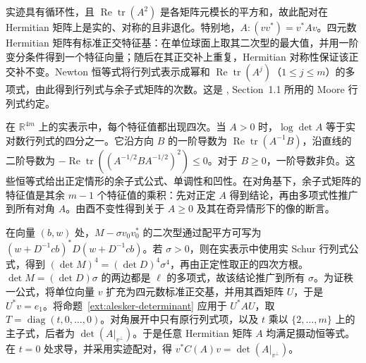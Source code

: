 实迹具有循环性，且 $\operatorname{Re}\operatorname{tr}(A^2)$ 是各矩阵元模长的平方和，故此配对在 Hermitian 矩阵上是实的、对称的且非退化。特别地，$A:(vv^*)=v^*Av$。四元数 Hermitian 矩阵有标准正交特征基：在单位球面上取其二次型的最大值，并用一阶变分条件得到一个特征向量；随后在其正交补上重复，Hermitian 对称性保证该正交补不变。Newton 恒等式将行列式表示成幂和 $\operatorname{Re}\operatorname{tr}(A^j)$（$1\le j\le m$）的多项式，由此得到行列式与余子式矩阵的次数。这是 \cite{r-2}, Section~1.1 所用的 Moore 行列式约定。

在 $\mathbb R^{4m}$ 上的实表示中，每个特征值都出现四次。当 $A>0$ 时，$\log\det A$ 等于实对数行列式的四分之一。它沿方向 $B$ 的一阶导数为 $\operatorname{Re}\operatorname{tr}(A^{-1}B)$，沿直线的二阶导数为 $-\operatorname{Re}\operatorname{tr}((A^{-1/2}BA^{-1/2})^2)\le0$。对于 $B\ge0$，一阶导数非负。这些恒等式给出正定情形的余子式公式、单调性和凹性。在对角基下，余子式矩阵的特征值是其余 $m-1$ 个特征值的乘积：先对正定 $A$ 得到结论，再由多项式性推广到所有对角 $A$。由酉不变性得到关于 $A\ge0$ 及其在奇异情形下的像的断言。

在向量 $(b,w)$ 处，$M-\sigma v_0v_0^*$ 的二次型通过配平方可写为 $(w+D^{-1}cb)^*D(w+D^{-1}cb)$。若 $\sigma>0$，则在实表示中使用实 Schur 行列式公式，得到 $(\det M)^4=(\det D)^4\sigma^4$，再由正定性取正的四次方根。$\det M=(\det D)\sigma$ 的两边都是 $\ell$ 的多项式，故该结论推广到所有 $\sigma$。为证秩一公式，将单位向量 $v$ 扩充为四元数标准正交基，并用其酉矩阵 $U$，于是 $U^*v=e_1$。将命题~\ref{ext:alesker-determinant} 应用于 $U^*AU$，取 $T=\operatorname{diag}(t,0,\ldots,0)$。对角展开中只有原行列式项，以及 $t$ 乘以 $\{2,\ldots,m\}$ 上的主子式，后者为 $\det(A|_{v^\perp})$。于是任意 Hermitian 矩阵 $A$ 均满足摄动恒等式。在 $t=0$ 处求导，并采用实迹配对，得 $v^* C(A)v=\det(A|_{v^\perp})$。

